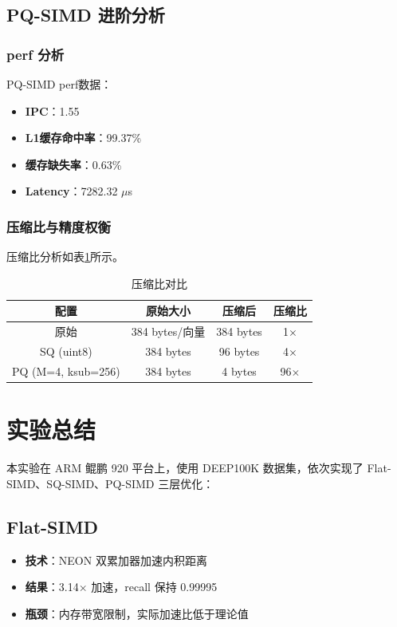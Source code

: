 \documentclass[a4paper]{article}
\begin{document}
\subsection{PQ-SIMD 进阶分析}

\subsubsection{perf 分析}

PQ-SIMD perf数据：
\begin{itemize}
  \item \textbf{IPC}：1.55
  \item \textbf{L1缓存命中率}：99.37\%
  \item \textbf{缓存缺失率}：0.63\%
  \item \textbf{Latency}：7282.32 $\mu$s
\end{itemize}

\subsubsection{压缩比与精度权衡}

压缩比分析如表\ref{table:compression}所示。

\begin{table}[!htbp]
  \centering
  \begin{tabular}{cccc}
  \toprule  
  \textbf{配置} & \textbf{原始大小} & \textbf{压缩后} & \textbf{压缩比} \\
  \midrule
  原始 & 384 bytes/向量 & 384 bytes & 1$\times$ \\
  SQ (uint8) & 384 bytes & 96 bytes & 4$\times$ \\
  PQ (M=4, ksub=256) & 384 bytes & 4 bytes & 96$\times$ \\
  \bottomrule
  \end{tabular}
  \caption{压缩比对比}
  \label{table:compression}
\end{table}

\section{实验总结}

本实验在 ARM 鲲鹏 920 平台上，使用 DEEP100K 数据集，依次实现了 Flat-SIMD、SQ-SIMD、PQ-SIMD 三层优化：

\subsection{Flat-SIMD}
\begin{itemize}
  \item \textbf{技术}：NEON 双累加器加速内积距离
  \item \textbf{结果}：3.14$\times$ 加速，recall 保持 0.99995
  \item \textbf{瓶颈}：内存带宽限制，实际加速比低于理论值
\end{itemize}
\end{document}
